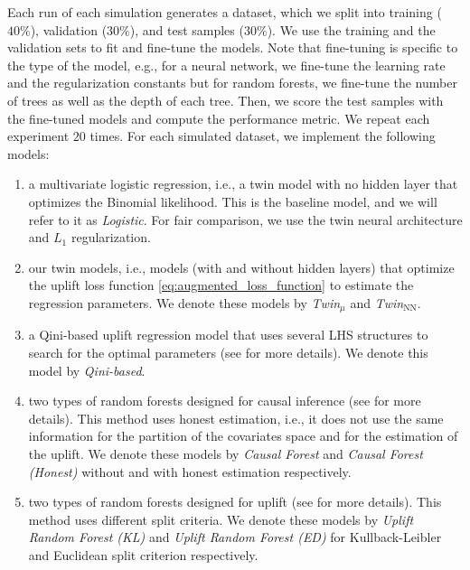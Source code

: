 \documentclass{article}
\begin{document}
Each run of each simulation generates a dataset, which we split into training ($40\%$), validation ($30\%$), and test samples ($30\%$). We use the training and the validation sets to fit and fine-tune the models. Note that fine-tuning is specific to the type of the model, e.g., for a neural network, we fine-tune the learning rate and the regularization constants but for random forests, we fine-tune the number of trees as well as the depth of each tree. Then, we score the test samples with the fine-tuned models and compute the performance metric. We repeat each experiment $20$ times. For each simulated dataset, we implement the following models:
\begin{enumerate}
    \item[(a)] a multivariate logistic regression, i.e., a twin model with no hidden layer that optimizes the Binomial likelihood. This is the baseline model, and we will refer to it as \textit{Logistic}. For fair comparison, we use the twin neural architecture and $L_1$ regularization.
    \item[(b)] our twin models, i.e., models (with and without hidden layers) that optimize the uplift loss function \eqref{eq:augmented_loss_function} to estimate the regression parameters. We denote these models by \textit{Twin$_{\mu}$} and \textit{Twin$_{\mathrm{NN}}$}.
    \item[(c)] a Qini-based uplift regression model that uses several LHS structures to search for the optimal parameters (see \cite{belba2019qbased} for more details). We denote this model by \textit{Qini-based}.
    \item[(d)] two types of random forests designed for causal inference (see \cite{athey2019generalized} for more details). This method uses honest estimation, i.e., it does not use the same information for the partition of the covariates space and for the estimation of the uplift. We denote these models by \textit{Causal Forest} and \textit{Causal Forest (Honest)} without and with honest estimation respectively.
    \item[(e)] two types of random forests designed for uplift (see \cite{rzepakowski2010decision,guelman2012random} for more details). This method uses different split criteria. We denote these models by \textit{Uplift Random Forest (KL)} and \textit{Uplift Random Forest (ED)} for Kullback-Leibler and Euclidean split criterion respectively.

\end{enumerate}
\end{document}
